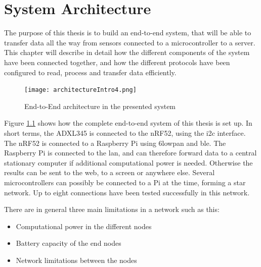 \chapter{System Architecture}
\label{chp:architecture} 

\noindent The purpose of this thesis is to build an end-to-end system, that will be able to transfer data all the way from sensors connected to a \gls{microcontroller} to a server. This chapter will describe in detail how the different components of the system have been connected together, and how the different protocols have been configured to read, process and transfer data efficiently. 

\begin{figure}[ht]
    \centering
    \texttt{[image: architectureIntro4.png]}    
    \caption{End-to-End architecture in the presented system}
    \label{fig:systemArchitectureThisSystem}
\end{figure}


\noindent Figure \ref{fig:systemArchitectureThisSystem} shows how the complete end-to-end system of this thesis is set up. In short terms, the \gls{ADXL345} is connected to the \gls{nRF52}, using the \gls{i2c} interface. The \gls{nRF52} is connected to a  \gls{Raspberry Pi} using \gls{6lowpan} and \gls{ble}. The \gls{Raspberry Pi} is connected to the \gls{lan}, and can therefore forward data to a central stationary computer if additional computational power is needed. Otherwise the results can be sent to the web, to a screen or anywhere else. Several \glspl{microcontroller} can possibly be connected to a Pi at the time, forming a star network. Up to eight connections have been tested successfully in this network. 
 
\noindent There are in general three main limitations in a network such as this:

\begin{itemize}
  \item Computational power in the different nodes
  \item Battery capacity of the end nodes
  \item Network limitations between the nodes
\end{itemize}


